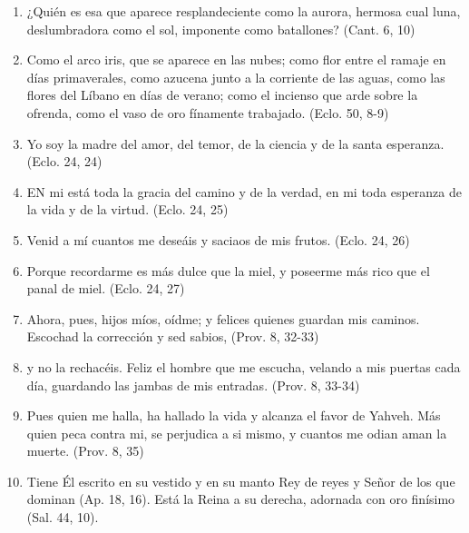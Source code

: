 \documentclass[a4paper,11pt]{article}
\begin{document}
      \begin{enumerate}

        \item ¿Quién es esa que aparece resplandeciente como la aurora,
        hermosa cual luna, deslumbradora como el sol, imponente como batallones? (Cant. 6, 10)

        \item Como el arco iris, que se aparece en las nubes; como flor entre el ramaje en días primaverales, como azucena junto
        a la corriente de las aguas, como las flores del Líbano en días de verano; como el incienso que arde sobre la ofrenda,
        como el vaso de oro fínamente trabajado. (Eclo. 50, 8-9)

        \item Yo soy la madre del amor, del temor, de la ciencia y de la santa esperanza. (Eclo. 24, 24)

        \item EN mi está toda la gracia del camino y de la verdad, en mi toda esperanza de la vida y de la virtud. (Eclo. 24, 25)

        \item Venid a mí cuantos me deseáis y saciaos de mis frutos. (Eclo. 24, 26)

        \item Porque recordarme es más dulce que la miel, y poseerme más rico que el panal de miel. (Eclo. 24, 27)

        \item Ahora, pues, hijos míos, oídme; y felices quienes guardan mis caminos. Escochad la corrección y sed sabios, (Prov. 8, 32-33)

        \item y no la rechacéis. Feliz el hombre que me escucha, velando a mis puertas cada día,
        guardando las jambas de mis entradas. (Prov. 8, 33-34)

        \item Pues quien me halla, ha hallado la vida y alcanza el favor de Yahveh. Más quien peca contra mi, se perjudica a si mismo,
        y cuantos me odian aman la muerte. (Prov. 8, 35)

        \item Tiene Él escrito en su vestido y en su manto Rey de reyes y Señor de los que dominan (Ap. 18, 16).
        Está la Reina a su derecha, adornada con oro finísimo (Sal. 44, 10).
      \end{enumerate}
\end{document}
